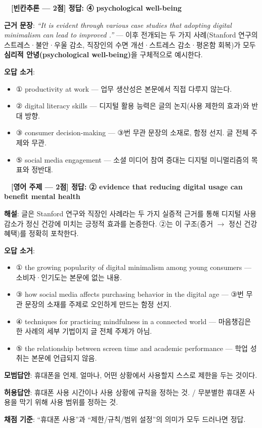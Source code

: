 \documentclass[11pt,a4paper]{article}
\newcommand{\qno}[1]{\par\vspace{10pt}\noindent{\sffamily\bfseries #1.}\ }
\begin{document}
\bigskip

\qno{2}\ \textbf{[빈칸추론 --- 2점] 정답: ④ psychological well-being}

\vspace{4pt}
\noindent\textbf{근거 문장}: \textit{``It is evident through various case studies that adopting digital minimalism can lead to improved \underline{\hspace{3.5cm}}.''} --- 이후 전개되는 두 가지 사례(Stanford 연구의 스트레스·불안·우울 감소, 직장인의 수면 개선·스트레스 감소·평온함 회복)가 모두 \textbf{심리적 안녕(psychological well-being)}을 구체적으로 예시한다.

\vspace{4pt}
\noindent\textbf{오답 소거}:
\begin{itemize}[leftmargin=2em,itemsep=1pt,topsep=2pt]
  \item ① productivity at work --- 업무 생산성은 본문에서 직접 다루지 않는다.
  \item ② digital literacy skills --- 디지털 활용 능력은 글의 논지(사용 제한의 효과)와 반대 방향.
  \item ③ consumer decision-making --- ③번 무관 문장의 소재로, 함정 선지. 글 전체 주제와 무관.
  \item ⑤ social media engagement --- 소셜 미디어 참여 증대는 디지털 미니멀리즘의 목표와 정반대.
\end{itemize}

\bigskip

\qno{3}\ \textbf{[영어 주제 --- 2점] 정답: ② evidence that reducing digital usage can benefit mental health}

\vspace{4pt}
\noindent\textbf{해설}: 글은 Stanford 연구와 직장인 사례라는 두 가지 실증적 근거를 통해 디지털 사용 감소가 정신 건강에 미치는 긍정적 효과를 논증한다. ②는 이 구조(증거 $\to$ 정신 건강 혜택)를 정확히 포착한다.

\vspace{6pt}
\noindent\textbf{오답 소거}:
\begin{itemize}[leftmargin=2em,itemsep=1pt,topsep=2pt]
  \item ① the growing popularity of digital minimalism among young consumers --- 소비자·인기도는 본문에 없는 내용.
  \item ③ how social media affects purchasing behavior in the digital age --- ③번 무관 문장의 소재를 주제로 오인하게 만드는 함정 선지.
  \item ④ techniques for practicing mindfulness in a connected world --- 마음챙김은 한 사례의 세부 기법이지 글 전체 주제가 아님.
  \item ⑤ the relationship between screen time and academic performance --- 학업 성취는 본문에 언급되지 않음.
\end{itemize}

\vspace{8pt}
\par\textbf{모범답안}: 휴대폰을 언제, 얼마나, 어떤 상황에서 사용할지 스스로 제한을 두는 것이다.
\par\textbf{허용답안}: 휴대폰 사용 시간이나 사용 상황에 규칙을 정하는 것. / 무분별한 휴대폰 사용을 막기 위해 사용 범위를 정하는 것.
\par\textbf{채점 기준}: ``휴대폰 사용''과 ``제한/규칙/범위 설정''의 의미가 모두 드러나면 정답.
\end{document}
